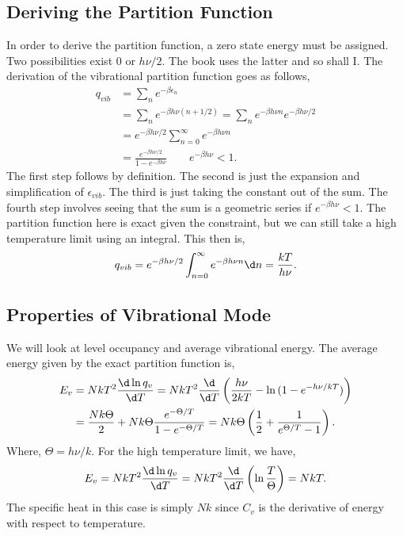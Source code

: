 \subsection{Deriving the Partition Function}
In order to derive the partition function, a zero state energy must be assigned.
Two possibilities exist 0 or $h\nu/2$. The book uses the latter and so shall I.
The derivation of the vibrational partition function goes as follows,
\begin{align*}
	q_{vib} &= \sum_{n}{e^{-\beta\epsilon_n}}\\
			&= \sum_{n}{e^{-\beta h\nu(n+1/2)}} = \sum_{n}{e^{-\beta h\nu
			n}e^{-\beta h\nu/2}}\\
			&= e^{-\beta h\nu/2}\sum_{n=0}^{\infty}{e^{-\beta h \nu n}}\\
			&= \frac{e^{-\beta h\nu/2}}{1 - e^{-\beta h \nu}} \qquad e^{-\beta h
			\nu} < 1.
\end{align*}
The first step follows by definition. The second is just the expansion and
simplification of $\epsilon_{vib}$. The third is just taking the constant out of
the sum. The fourth step involves seeing that the sum is a geometric series if
$e^{-\beta h \nu} < 1$. The partition function here is exact given the
constraint, but we can still take a high temperature limit using an integral.
This then is,
\begin{equation*}
	q_{vib} = e^{-\beta h\nu/2}\int_{n=0}^{\infty}{e^{-\beta h \nu n}\d n}
	= \frac{kT}{h\nu}.
\end{equation*}
\subsection{Properties of Vibrational Mode}
We will look at level occupancy and average vibrational energy. The average
energy given by the exact partition function is,
\begin{align*}
	E_v &= NkT^2 \frac{\d\ln q_v}{\d T} = NkT^2\frac{\d}{\d T}
	\left(\frac{h\nu}{2kT} - \ln{(1 - e^{-h\nu/kT})}\right)\\
		&= \frac{Nk\Theta}{2} + Nk\Theta \frac{e^{-\Theta/T}}{1 -
			e^{-\Theta/T}} = Nk\Theta \left(\frac{1}{2} + \frac{1}{e^{\Theta/T}
		-1}\right).
\end{align*}
Where, $\Theta = h\nu/k$. For the high temperature limit, we have,
\begin{equation*}
	E_v = NkT^2 \frac{\d\ln q_v}{\d T} = NkT^2 \frac{\d}{\d
	T}\left(\ln{\frac{T}{\Theta}}\right) = NkT.
\end{equation*}
The specific heat in this case is simply $Nk$ since $C_v$ is the derivative of
energy with respect to temperature.

